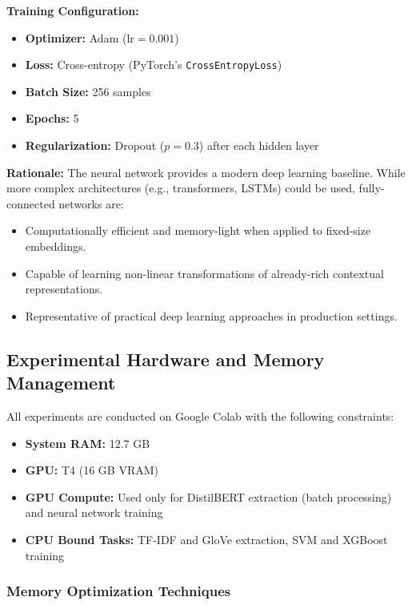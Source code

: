 \documentclass[12pt, a4paper]{article}
\begin{document}
\textbf{Training Configuration:}
\begin{itemize}
    \item \textbf{Optimizer:} Adam ($\text{lr} = 0.001$)
    \item \textbf{Loss:} Cross-entropy (PyTorch's \texttt{CrossEntropyLoss})
    \item \textbf{Batch Size:} 256 samples
    \item \textbf{Epochs:} 5
    \item \textbf{Regularization:} Dropout ($p=0.3$) after each hidden layer
\end{itemize}

\textbf{Rationale:} The neural network provides a modern deep learning baseline. While more complex architectures (e.g., transformers, LSTMs) could be used, fully-connected networks are:
\begin{itemize}
    \item Computationally efficient and memory-light when applied to fixed-size embeddings.
    \item Capable of learning non-linear transformations of already-rich contextual representations.
    \item Representative of practical deep learning approaches in production settings.
\end{itemize}

\subsection{Experimental Hardware and Memory Management}

All experiments are conducted on Google Colab with the following constraints:

\begin{itemize}
    \item \textbf{System RAM:} 12.7 GB
    \item \textbf{GPU:} T4 (16 GB VRAM)
    \item \textbf{GPU Compute:} Used only for DistilBERT extraction (batch processing) and neural network training
    \item \textbf{CPU Bound Tasks:} TF-IDF and GloVe extraction, SVM and XGBoost training
\end{itemize}

\subsubsection{Memory Optimization Techniques}
\end{document}

